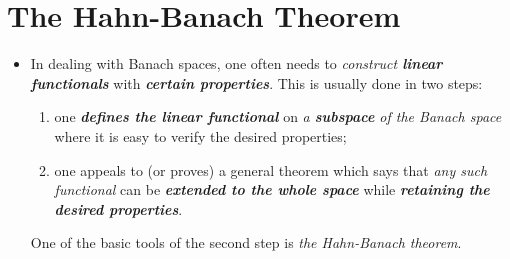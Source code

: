 \documentclass[11pt]{article}
\begin{document}
\section{The Hahn-Banach Theorem}
\begin{itemize}
\item \begin{remark}
In dealing with Banach spaces, one often needs to \emph{construct \textbf{linear functionals}} with \emph{\textbf{certain properties}}. This is usually done in two steps:
\begin{enumerate}
\item one \emph{\textbf{defines the linear functional}} on \emph{a \textbf{subspace} of the Banach space} where it is easy to verify the desired properties;
\item one appeals to (or proves) a general theorem which says that \emph{any such functional} can be \emph{\textbf{extended to the whole space}} while \emph{\textbf{retaining the desired properties}}.
\end{enumerate}
One of the basic tools of the second step is \emph{the Hahn-Banach theorem}.
\end{remark}
\end{itemize}
\end{document}
